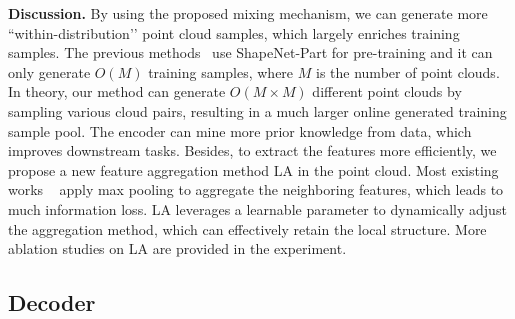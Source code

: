\documentclass[journal]{IEEEtran}
\begin{document}
\textbf{Discussion.} By using the proposed mixing mechanism, we can generate more ``within-distribution’’ point cloud samples, which largely enriches training samples. The previous methods~\cite{sauder2019self} use ShapeNet-Part for pre-training and it can only generate $O(M)$ training samples, where $M$ is the number of point clouds. In theory, our method can generate $O(M\times M)$ different point clouds by sampling various cloud pairs, resulting in a much larger online generated training sample pool. The encoder can mine more prior knowledge from data, which improves downstream tasks. Besides, to extract the features more efficiently, we propose a new feature aggregation method LA in the point cloud. Most existing works ~\cite{qi2017pointnet++, wang2019dynamic} apply max pooling to aggregate the neighboring features, which leads to much information loss. LA leverages a learnable parameter to dynamically adjust the aggregation method, which can effectively retain the local structure. More ablation studies on LA are provided in the experiment.


\subsection{Decoder}
\end{document}
